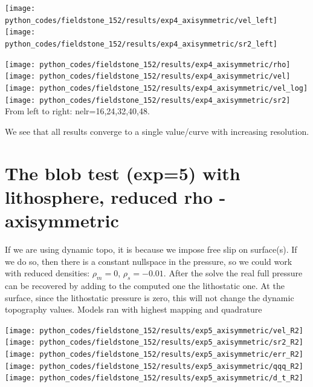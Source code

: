 \begin{center}
\texttt{[image: python\_codes/fieldstone\_152/results/exp4\_axisymmetric/vel\_left]}
\texttt{[image: python\_codes/fieldstone\_152/results/exp4\_axisymmetric/sr2\_left]}
\end{center}


\begin{center}
\texttt{[image: python\_codes/fieldstone\_152/results/exp4\_axisymmetric/rho]}\\
\texttt{[image: python\_codes/fieldstone\_152/results/exp4\_axisymmetric/vel]}\\
\texttt{[image: python\_codes/fieldstone\_152/results/exp4\_axisymmetric/vel\_log]}\\
\texttt{[image: python\_codes/fieldstone\_152/results/exp4\_axisymmetric/sr2]}\\
{\captionfont From left to right: nelr=16,24,32,40,48.}
\end{center}

We see that all results converge to a single value/curve with increasing resolution.

\newpage
\section*{The blob test (exp=5)  with lithosphere, reduced rho - axisymmetric}

If we are using dynamic topo, it is because we impose free slip on surface(s).
If we do so, then there is a constant nullspace in the pressure, so we could 
work with reduced densities: $\rho_m=0$, $\rho_s=-0.01$.
After the solve the real full pressure can be recovered by adding to the 
computed one the lithostatic one.
At the surface, since the lithostatic pressure is zero, this will not change the 
dynamic topography values.
Models ran with highest mapping and quadrature

\begin{center}
\texttt{[image: python\_codes/fieldstone\_152/results/exp5\_axisymmetric/vel\_R2]}
\texttt{[image: python\_codes/fieldstone\_152/results/exp5\_axisymmetric/sr2\_R2]}\\
\texttt{[image: python\_codes/fieldstone\_152/results/exp5\_axisymmetric/err\_R2]}
\texttt{[image: python\_codes/fieldstone\_152/results/exp5\_axisymmetric/qqq\_R2]}\\
\texttt{[image: python\_codes/fieldstone\_152/results/exp5\_axisymmetric/d\_t\_R2]}
\end{center}

